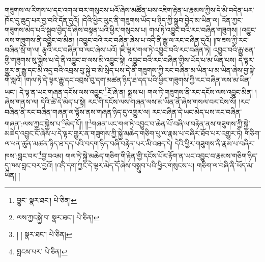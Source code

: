 གཟུགས་ལ་རིགས་པ་དང་འགལ་བར་གསུངས་པའོ་ཞེས་མཚོན་པས་འཇིག་རྟེན་པ་རྣམས་ཀྱིས་དེ་མི་བདེན་པར་ཁོང་དུ་ཆུད་པར་བྱ་བའི་དོན་དུའོ། །དེའི་ཕྱིར་ལུང་ནི་གཟུགས་ཡོད་པ་ཉིད་ཀྱི་སྒྲུབ་བྱེད་མ་ཡིན་ལ། འོན་ཀྱང་གཟུགས་མེད་པའི་སྒྲུབ་བྱེད་དོ་ཞེས་བསྟན་པའི་ཕྱིར་གསུངས་པ། གལ་ཏེ་འབྱུང་བའི་རང་བཞིན་གཟུགས། །འབྱུང་ལས་གཟུགས་ནི་འབྱུང་བ་མིན། །འབྱུང་བའི་རང་བཞིན་ཞེས་པ་འདི་ནི་རྒྱུ་ལ་རང་བཞིན་དུའོ། །ཁ་ཟས་ཀྱི་རང་བཞིན་སྲོ་ག་ལ། རྩྭའི་རང་བཞིན་བ་ལང་ཞེས་པའོ། །ཇི་ལྟར་གལ་ཏེ་འབྱུང་བའི་རང་བཞིན་ཏེ། འབྱུང་བའི་རྒྱུ་ཅན་གྱི་གཟུགས་སུ་སྐྱེས་པ་དེ་ནི་འབྱུང་བ་ལས་མི་འབྱུང་སྟེ། འབྱུང་བའི་རང་བཞིན་གྱིས་ཡོད་པ་མ་ཡིན་པས། དེ་ལྟར་གྱུར་ན་རྒྱུ་དང་མི་འདྲ་བའི་འབྲས་བུ་སྐྱེ་བ་མི་སྲིད་པས་དེ་ནི་གཟུགས་ཀྱི་རང་བཞིན་མ་ཡིན་པ་མ་ཡིན་ཞེས་བྱ་སྟེ་གོ་སླའོ། །གལ་ཏེ་དེ་ལྟར་རྒྱུ་དང་འབྲས་བུ་དག་མཚན་ཉིད་ཐ་དད་པའི་ཕྱིར་གཟུགས་ཀྱི་རང་བཞིན་ལས་མ་ཡིན་ཡང་། དེ་ལྟ་ན་ཡང་གཞན་དངོས་ལས་འབྱུང་\footnote{བྱུང་  སྣར་ཐང་།  པེ་ཅིན། }ངོ་ཞེ་ན། སྨྲས་པ། གལ་ཏེ་གཟུགས་ནི་རང་དངོས་ལས་འབྱུང་མིན། །ཞེས་གནས་ལ། དེའི་ཚེ་དེ་མེད་པ་སྟེ། རང་གི་དངོས་ལས་གཞན་ལས་མ་ཡིན་ནོ་ཞེས་གསལ་བར་ངེས་སོ། །རང་བཞིན་ནི་རང་བཞིན་གཞན་ལ་ལྟོས་ནས་གཞན་ཉིད་དུ་འགྱུར་ལ། རང་བཞིན་དེ་ཡང་མེད་པས་རང་བཞིན་གཞན་:ལས་ཀྱང་སྐྱེས་པ་\footnote{ལས་ཀྱངསྐྱེ་བ་  སྣར་ཐང་།  པེ་ཅིན། }མེད་དོ།། །།\footnote{། །  སྣར་ཐང་།  པེ་ཅིན། }གཞན་ཡང་གལ་ཏེ་འབྱུང་བ་ཆེན་པོ་བཞི་ལ་བརྟེན་ནས་གཟུགས་ཀྱི་སྐྱེ་མཆེད་འབྱུང་ངོ་ཞེས་པ་དེ་ལྟར་གྱུར་ན་གཟུགས་ཀྱི་སྐྱེ་མཆེད་གཅིག་པུ་ལ་རྣམ་པ་བཞིར་ཐོབ་པར་འགྱུར་ཏེ། གཅིག་ལ་ཕན་ཚུན་མཚན་ཉིད་ཐ་དད་པའི་བདག་ཉིད་བཞི་བརྟེན་པར་མི་འཐད་དེ། དེའི་ཕྱིར་གཟུགས་ནི་རྣམ་པ་བཞིར་ཁས་:བླང་བར་\footnote{བླངས་པར་  པེ་ཅིན། }བྱ་བའམ། གལ་ཏེ་སྐྱེ་མཆེད་གཅིག་གི་རྟེན་གྱི་དངོས་པོར་རྟོག་ན་ཡང་འབྱུང་བ་རྣམས་གཅིག་ཉིད་དུ་ཁས་བླང་བར་བྱའོ། །འདི་དག་ཀྱང་དེ་ལྟར་མེད་དོ་ཞེས་བསྒྲུབ་པའི་ཕྱིར་གསུངས་པ། གཅིག་ལ་བཞི་ནི་ཡོད་མ་ཡིན། །
